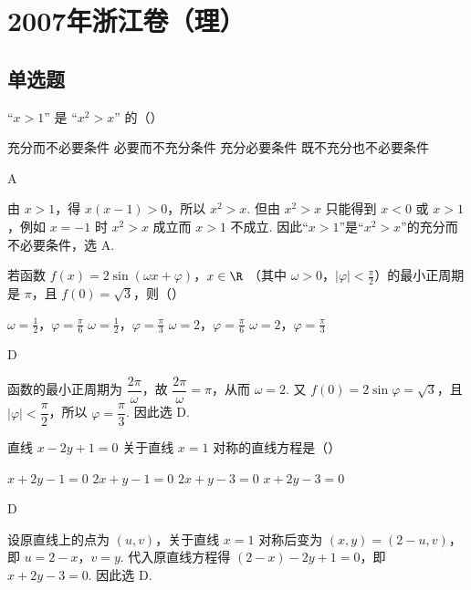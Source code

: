
\chapter{2007年浙江卷（理）}

\section{单选题}

\begin{problem}
“\(x > 1\)” 是 “\(x^{2} > x\)” 的（\quad）

\choices
    {充分而不必要条件}
    {必要而不充分条件}
    {充分必要条件}
    {既不充分也不必要条件}
\begin{answer}
A
\end{answer}

\begin{solution}
由 \(x>1\)，得 \(x(x-1)>0\)，所以 \(x^2>x\). 但由 \(x^2>x\) 只能得到 \(x<0\) 或 \(x>1\)，例如 \(x=-1\) 时 \(x^2>x\) 成立而 \(x>1\) 不成立. 因此“\(x>1\)”是“\(x^2>x\)”的充分而不必要条件，选 A.
\end{solution}
\end{problem}

\begin{problem}
若函数 \(f(x) = 2\sin(\omega x + \varphi)\)，\(x \in \R\) （其中 \(\omega > 0\)，\(|\varphi| < \frac{\pi}{2}\)）的最小正周期是 \( \pi \)，且 \( f(0) = \sqrt{3} \)，则（\quad）

\choices
    {\(\omega = \frac{1}{2}\)，\(\varphi = \frac{\pi}{6}\)}
    {\(\omega = \frac{1}{2}\)，\(\varphi = \frac{\pi}{3}\)}
    {\(\omega = 2\)，\(\varphi = \frac{\pi}{6}\)}
    {\(\omega = 2\)，\(\varphi = \frac{\pi}{3}\)}
\begin{answer}
D
\end{answer}

\begin{solution}
函数的最小正周期为 \(\dfrac{2\pi}{\omega}\)，故 \(\dfrac{2\pi}{\omega}=\pi\)，从而 \(\omega=2\). 又 \(f(0)=2\sin\varphi=\sqrt{3}\)，且 \(\lvert\varphi\rvert<\dfrac{\pi}{2}\)，所以 \(\varphi=\dfrac{\pi}{3}\). 因此选 D.
\end{solution}
\end{problem}

\begin{problem}
直线 \(x - 2y + 1 = 0\) 关于直线 \(x = 1\) 对称的直线方程是（\quad）

\choices
    {\(x + 2y - 1 = 0\)}
    {\(2x + y - 1 = 0\)}
    {\(2x + y - 3 = 0\)}
    {\(x + 2y - 3 = 0\)}
\begin{answer}
D
\end{answer}

\begin{solution}
设原直线上的点为 \((u,v)\)，关于直线 \(x=1\) 对称后变为 \((x,y)=(2-u,v)\)，即 \(u=2-x\)，\(v=y\). 代入原直线方程得 \((2-x)-2y+1=0\)，即 \(x+2y-3=0\). 因此选 D.
\end{solution}
\end{problem}

